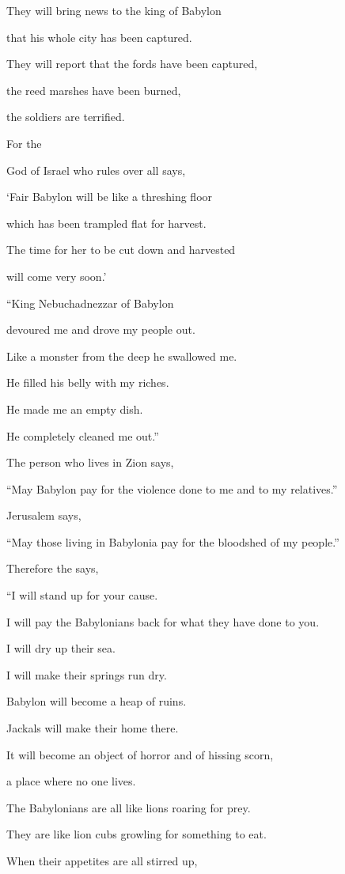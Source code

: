 {\par }{\Q They
will bring news
to the king
of Babylon
\par }{\Q that
his whole city
has been captured.
\par }{\Q {}They will report that the fords
have been captured,
\par }{\Q the reed marshes
have been burned,
\par }{\Q the soldiers
are terrified.
\par }{\Q {}For
the

{}
God
of Israel
who rules over all
says,
\par }{\Q ‘Fair
Babylon
will
be like a
threshing floor
\par }{\Q which has been
trampled flat for harvest.
\par }{\Q The time
for her to be cut down and harvested
\par }{\Q will come
very soon.’
\par }{\Q {}“King
Nebuchadnezzar
of Babylon
\par }{\Q devoured
me and drove
my people out.
\par }{\Q Like a monster
from the deep he swallowed
me.
\par }{\Q He filled
his belly
with my riches.
\par }{\Q He made me an empty
dish.
\par }{\Q He completely cleaned
me out.”
\par }{\Q {}The person who lives in
Zion
says,
\par }{\Q “May Babylon
pay for the violence
done to me
and to
my relatives.”
\par }{\Q Jerusalem
says,
\par }{\Q “May those living
in Babylonia
pay for the bloodshed of my people.”
\par }{\Q {}Therefore
the {}
says,
\par }{\Q “I
will stand up
for your cause.
\par }{\Q I
will pay
the Babylonians back
for what they have done to you.

\par }{\Q I will dry
up their
sea.
\par }{\Q I will make their
springs
run
dry.
\par }{\Q {}Babylon
will become
a heap
of ruins.
\par }{\Q Jackals
will make their home
there.

\par }{\Q It will become an object of horror
and of hissing
scorn,
\par }{\Q a place where no
one lives.
\par }{\Q {}The Babylonians are all like lions
roaring
for prey.
\par }{\Q They are like lion
cubs
growling for something to eat.
\par }{\Q {}When their appetites
are all stirred up,

}
